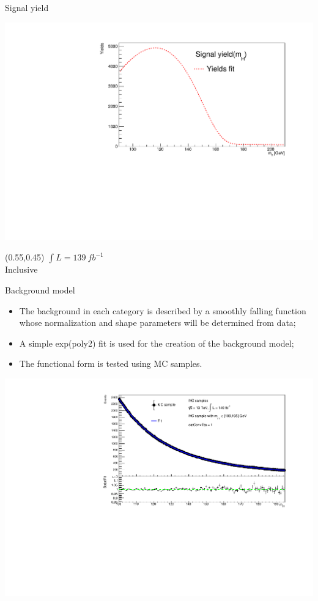 \documentclass[10pt,UKenglish, leqno, xcolor = dvipsnames]{beamer}
\begin{document}
	\begin{frame}{Signal yield}
		\vfill
		\begin{center}
			\includegraphics[width=.9\textwidth]{Pres_Images/check_yields.pdf}
		\end{center}
		\begin{textblock}{1}(0.55,0.45)
			$\int L = 139\ fb^{-1}$\\
			Inclusive
		\end{textblock}
		\vfill
	\end{frame}

	\begin{frame}{Background model}
		\vfill
		\begin{itemize}
			\item The background in each category is described by a smoothly falling function whose normalization and shape parameters will be determined from data;
			\item A simple exp(poly2) fit is used for the creation of the background model;
			\item The functional form is tested using MC samples.
		\end{itemize}
		\begin{center}
			\includegraphics[width=.7\textwidth]{Pres_Images/bkg_100_195GeV_fit_catConvEta_1.pdf}
		\end{center}
		\vfill
	\end{frame}
	
\end{document}
